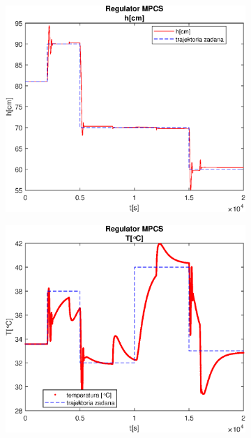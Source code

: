 \begin{figure}[h!]
   \centering
   \begin{subfigure}[b]{0.4\textwidth}
      \includegraphics[width=1\linewidth]{img/MPCSanaRK/distMPCSRKHN100Nu10l10.eps}
      \caption{}
      \label{fig:fig:distMPCSRKN100Nu10l101}
   \end{subfigure}
       
   \begin{subfigure}[b]{0.4\textwidth}
      \includegraphics[width=1\linewidth]{img/MPCSanaRK/distMPCSRKTN100Nu10l10.eps}
      \caption{}
      \label{fig:fig:distMPCSRKN100Nu10l102}
   \end{subfigure}
       

\end{figure}
